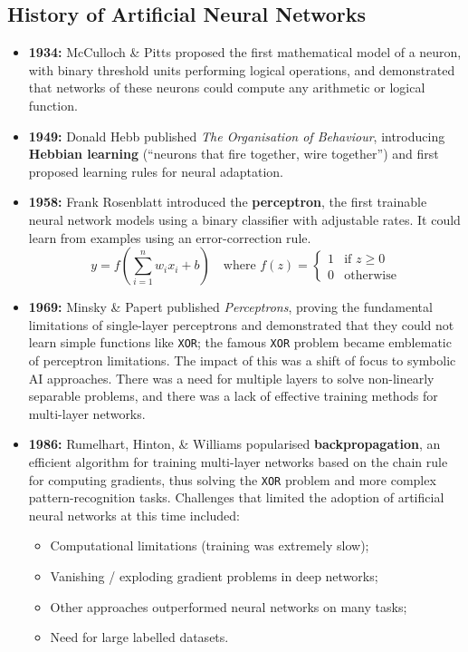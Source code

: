 \documentclass[a4paper,11pt]{article}
\begin{document}
\subsection{History of Artificial Neural Networks}
\begin{itemize}
    \item   \textbf{1934:} McCulloch \& Pitts proposed the first mathematical model of a neuron, with binary threshold units performing logical operations, and demonstrated that networks of these neurons could compute any arithmetic or logical function.

    \item   \textbf{1949:} Donald Hebb published \textit{The Organisation of Behaviour}, introducing \textbf{Hebbian learning} (``neurons that fire together, wire together'') and first proposed learning rules for neural adaptation.

    \item   \textbf{1958:} Frank Rosenblatt introduced the \textbf{perceptron}, the first trainable neural network models using a binary classifier with adjustable rates.
            It could learn from examples using an error-correction rule.
            \[
                y = f \left( \sum^n_{i=1} w_ix_i + b \right) \quad \text{where } f(z) =
                \begin{cases}
                    1 & \text{if } z \geq 0 \\
                    0 & \text{otherwise}
                \end{cases}
            \]

    \item   \textbf{1969:} Minsky \& Papert published \textit{Perceptrons}, proving the fundamental limitations of single-layer perceptrons and demonstrated that they could not learn simple functions like \verb|XOR|;
            the famous \verb|XOR| problem became emblematic of perceptron limitations.
            The impact of this was a shift of focus to symbolic AI approaches.
            There was a need for multiple layers to solve non-linearly separable problems, and there was a lack of effective training methods for multi-layer networks.
    
    \item   \textbf{1986:} Rumelhart, Hinton, \& Williams popularised \textbf{backpropagation}, an efficient algorithm for training multi-layer networks based on the chain rule for computing gradients, thus solving the \verb|XOR| problem and more complex pattern-recognition tasks.
            Challenges that limited the adoption of artificial neural networks at this time included:
            \begin{itemize}
                \item   Computational limitations (training was extremely slow);
                \item   Vanishing / exploding gradient problems in deep networks;
                \item   Other approaches outperformed neural networks on many tasks;
                \item   Need for large labelled datasets.
            \end{itemize}


\end{itemize}
\end{document}

